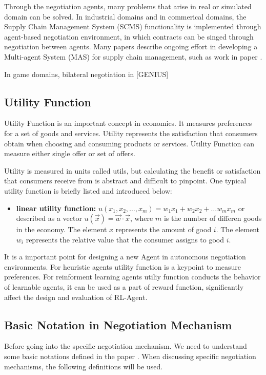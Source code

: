 Through the negotiation agents, many problems that arise in real or simulated domain can be solved. In industrial domains and in commerical domains, the Supply Chain Management System (SCMS) functionality is implemented through agent-based negotiation environment, in which contracts can be singed through negotiation between agents. Many papers describe ongoing effort in developing a Multi-agent System (MAS) for supply chain management, such as work in paper \parencite{Lee2004}.

In game domains, bilateral negotiation in [GENIUS]

\subsection{Utility Function}
Utility Function is an important concept in economics. It measures preferences for a set of goods and services. Utility represents the satisfaction that consumers obtain when choosing and consuming products or services\parencite{ANDRIY2019}. Utility Function can measure either single offer or set of offers.

Utility is measured in units called utils, but calculating the benefit or satisfaction that consumers receive from is abstract and difficult to pinpoint\parencite{ANDRIY2019}. One typical utility function is briefly listed and introduced below:

\begin{itemize}
\item \textbf{linear utility function:} $u\left(x_{1}, x_{2}, \ldots, x_{m}\right)=w_{1} x_{1}+w_{2} x_{2}+\ldots w_{m} x_{m}$ or described as a vector $u(\vec{x})=\vec{w} \cdot \vec{x}$, where $m$ is the number of differen goods in the economy. The element $x$ represents the amount of good $i$. The element $w_i$ represents the relative value that the consumer assigns to good $i$.
\end{itemize}

It is a important point for designing a new Agent in autonomous negotiation environments. For heuristic agents utility function is a keypoint to measure preferences. For reinforment learning agents utiliy function conducts the behavior of learnable agents, it can be used as a part of reward function, significantly affect the design and evaluation of RL-Agent.

\subsection{Basic Notation in Negotiation Mechanism} \label{background:autonmous-negotiation:basic-notation}
Before going into the specific negotiation mechanism. We need to understand some basic notations defined in the paper \parencite{Aydoğan2017}.
When discussing specific negotiation mechanisms, the following definitions will be used.

